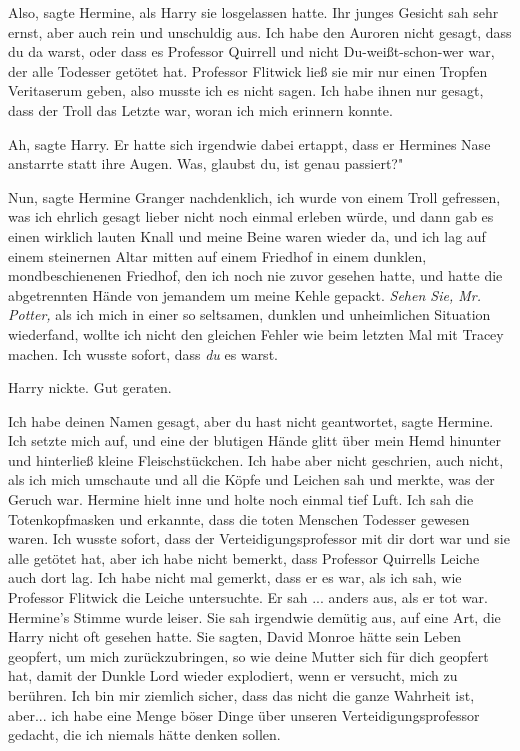 \glqq Also\grqq{}, sagte Hermine, als Harry sie losgelassen hatte. Ihr junges
Gesicht sah sehr ernst, aber auch rein und unschuldig aus. \glqq Ich habe den
Auroren nicht gesagt, dass du da warst, oder dass es Professor Quirrell und
nicht Du-weißt-schon-wer war, der alle Todesser getötet hat. Professor Flitwick
ließ sie mir nur einen Tropfen Veritaserum geben, also musste ich es nicht
sagen. Ich habe ihnen nur gesagt, dass der Troll das Letzte war, woran ich mich
erinnern konnte.\grqq{}

\glqq Ah\grqq{}, sagte Harry. Er hatte sich irgendwie dabei ertappt, dass er
Hermines Nase anstarrte statt ihre Augen. \glqq Was, glaubst du, ist genau
passiert?"

\glqq Nun\grqq{}, sagte Hermine Granger nachdenklich, \glqq ich wurde von einem
Troll gefressen, was ich ehrlich gesagt lieber nicht noch einmal erleben würde,
und dann gab es einen wirklich lauten Knall und meine Beine waren wieder da, und
ich lag auf einem steinernen Altar mitten auf einem Friedhof in einem dunklen,
mondbeschienenen Friedhof, den ich noch nie zuvor gesehen hatte, und hatte die
abgetrennten Hände von jemandem um meine Kehle gepackt. \emph{Sehen Sie, Mr.
Potter,} als ich mich in einer so seltsamen, dunklen und unheimlichen Situation
wiederfand, wollte ich nicht den gleichen Fehler wie beim letzten Mal mit Tracey
machen. Ich wusste sofort, dass \emph{du} es warst.\grqq{}

Harry nickte. \glqq Gut geraten.\grqq{}

\glqq Ich habe deinen Namen gesagt, aber du hast nicht geantwortet\grqq{}, sagte
Hermine. \glqq Ich setzte mich auf, und eine der blutigen Hände glitt über mein
Hemd hinunter und hinterließ kleine Fleischstückchen. Ich habe aber nicht
geschrien, auch nicht, als ich mich umschaute und all die Köpfe und Leichen sah
und merkte, was der Geruch war.\grqq{} Hermine hielt inne und holte noch einmal
tief Luft. \glqq Ich sah die Totenkopfmasken und erkannte, dass die toten
Menschen Todesser gewesen waren. Ich wusste sofort, dass der
Verteidigungsprofessor mit dir dort war und sie alle getötet hat, aber ich habe
nicht bemerkt, dass Professor Quirrells Leiche auch dort lag. Ich habe nicht mal
gemerkt, dass er es war, als ich sah, wie Professor Flitwick die Leiche
untersuchte. Er sah ... anders aus, als er tot war.\grqq{} Hermine's Stimme
wurde leiser. Sie sah irgendwie demütig aus, auf eine Art, die Harry nicht oft
gesehen hatte. \glqq Sie sagten, David Monroe hätte sein Leben geopfert, um mich
zurückzubringen, so wie deine Mutter sich für dich geopfert hat, damit der
Dunkle Lord wieder explodiert, wenn er versucht, mich zu berühren. Ich bin mir
ziemlich sicher, dass das nicht die ganze Wahrheit ist, aber... ich habe eine
Menge böser Dinge über unseren Verteidigungsprofessor gedacht, die ich niemals
hätte denken sollen.\grqq{}

